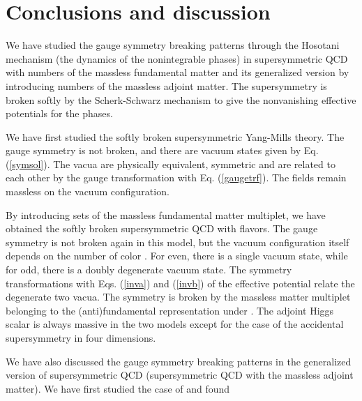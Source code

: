 \documentclass[a4paper,12pt]{article}
\begin{document}
{\section{Conclusions and discussion}
We have studied the gauge symmetry breaking patterns through the Hosotani
mechanism (the dynamics of the nonintegrable phases) in supersymmetric 
QCD with \coordHE{} numbers of the massless fundamental matter and 
its generalized version by introducing \coordHE{} numbers of the 
massless adjoint matter. The supersymmetry is broken softly by
the Scherk-Schwarz mechanism to give the nonvanishing effective potentials
for the phases.
\par
We have first studied the softly broken supersymmetric Yang-Mills 
theory. The \coordHE{} gauge symmetry is not 
broken, and there are \coordHE{} vacuum states given 
by Eq. (\ref{symsol}). The \coordHE{} vacua are
physically equivalent, \coordHE{} symmetric and are 
related to each other by the 
gauge transformation with Eq. (\ref{gaugetrf}).  
The fields \coordHE{} remain massless
on the vacuum configuration.
\par
By introducing \coordHE{} sets of the massless 
fundamental matter multiplet, we have obtained 
the softly broken supersymmetric QCD with \coordHE{} flavors. 
The \coordHE{} gauge symmetry is not 
broken again in this model, but the vacuum configuration itself 
depends on the number of
color \coordHE{}. For \coordHE{} even, there is a single vacuum state, while
for \coordHE{} odd, there is a doubly degenerate vacuum state.
The symmetry transformations with 
Eqs. (\ref{inva}) and (\ref{invb}) of the effective potential 
relate the degenerate two vacua. 
The \coordHE{} symmetry is broken by the 
massless matter multiplet belonging to the (anti)fundamental 
representation under \coordHE{}. The adjoint Higgs scalar is always massive
in the two models except for the case of the accidental \coordHE{}
supersymmetry in four dimensions. 
\par
We have also discussed the gauge symmetry breaking patterns in 
the generalized version of supersymmetric 
QCD (supersymmetric QCD with the massless adjoint matter).
We have first studied the case of \coordHE{} and found 
}
\end{document}

